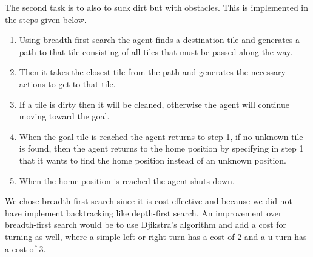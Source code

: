\documentclass[a4paper,10pt]{article}
\begin{document}
The second task is to also to suck dirt but with obstacles. 
This is implemented in the steps given below.
\begin{enumerate}
	\item Using breadth-first search the agent finds a destination tile and generates a path to that tile consisting of all tiles that must be passed along the way.
	\item Then it takes the closest tile from the path and generates the necessary actions to get to that tile.
	\item If a tile is dirty then it will be cleaned, otherwise the agent will continue moving toward the goal.
	\item When the goal tile is reached the agent returns to step 1, if no unknown tile is found, then the agent returns to the home position by specifying in step 1 that it wants to find the home position instead of an unknown position.
	\item When the home position is reached the agent shuts down.
\end{enumerate}
We chose breadth-first search since it is cost effective and because we did not have implement backtracking like depth-first search.
An improvement over breadth-first search would be to use Djikstra's algorithm and add a cost for turning as well, where a simple left or right turn has a cost
of 2 and a u-turn has a cost of 3.
\end{document}
